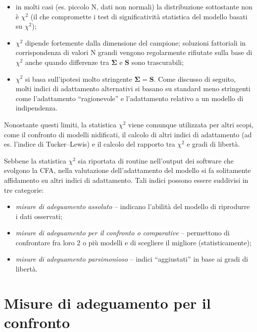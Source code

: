 \documentclass[
  11pt,
]{krantz}
\providecommand{\tightlist}{%
  \setlength{\itemsep}{0pt}\setlength{\parskip}{0pt}}
\theoremstyle{definition}
\theoremstyle{definition}
\theoremstyle{definition}
\theoremstyle{definition}
\theoremstyle{remark}
\begin{document}
\begin{itemize}
\tightlist
\item
  in molti casi (es. piccolo N, dati non normali) la distribuzione sottostante non è \(\chi^2\) (il che compromette i test di significatività statistica del modello basati su \(\chi^2\));
\item
  \(\chi^2\) dipende fortemente dalla dimensione del campione; soluzioni fattoriali in corrispondenza di valori N grandi vengono regolarmente rifiutate sulla base di \(\chi^2\) anche quando differenze tra \(\boldsymbol{\Sigma}\) e \(\boldsymbol{S}\) sono trascurabili;
\item
  \(\chi^2\) si basa sull'ipotesi molto stringente \(\boldsymbol{\Sigma} = \boldsymbol{S}\). Come discusso di seguito, molti indici di adattamento alternativi si basano su standard meno stringenti come l'adattamento ``ragionevole'' e l'adattamento relativo a un modello di indipendenza.
\end{itemize}

Nonostante questi limiti, la statistica \(\chi^2\) viene comunque utilizzata per altri scopi, come il confronto di modelli nidificati, il calcolo di altri indici di adattamento (ad es. l'indice di Tucker--Lewis) e il calcolo del rapporto tra \(\chi^2\) e gradi di libertà.

Sebbene la statistica \(\chi^2\) sia riportata di routine nell'output dei software che svolgono la CFA, nella valutazione dell'adattamento del modello si fa solitamente affidamento su altri indici di adattamento. Tali indici possono essere suddivisi in tre categorie:

\begin{itemize}
\tightlist
\item
  \emph{misure di adeguamento assoluto} -- indicano l'abilità del modello di riprodurre i dati osservati;
\item
  \emph{misure di adeguamento per il confronto o comparative} -- permettono di confrontare fra loro 2 o più modelli e di scegliere il migliore (statisticamente);
\item
  \emph{misure di adeguamento parsimonioso} -- indici ``aggiustati'' in base ai gradi di libertà.
\end{itemize}

\hypertarget{misure-di-adeguamento-per-il-confronto}{%
\section{Misure di adeguamento per il confronto}\label{misure-di-adeguamento-per-il-confronto}}
\end{document}
